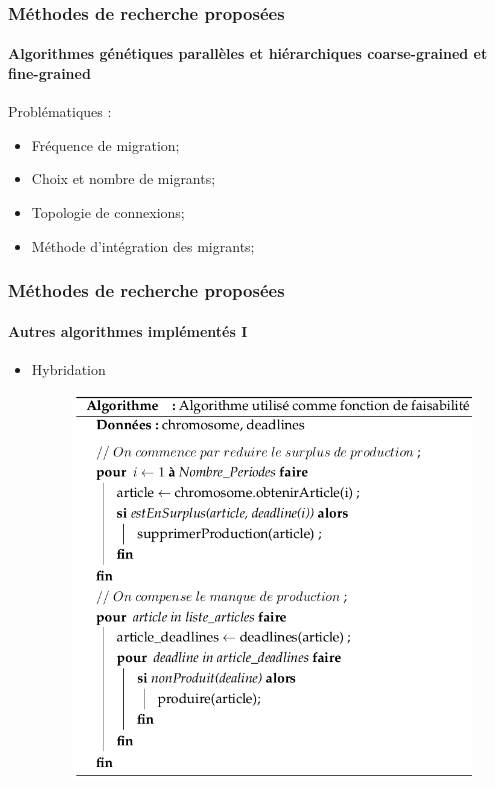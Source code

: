 \documentclass[11pt]{beamer}
\begin{document}
 \begin{frame}
 \frametitle{Méthodes de recherche proposées}
 \framesubtitle{Algorithmes génétiques parallèles et hiérarchiques coarse-grained et
fine-grained}
	
	Problématiques :
	\begin{itemize}
		\item Fréquence de migration;
		\item Choix et nombre de migrants;
		\item Topologie de connexions;
		\item Méthode d’intégration des migrants;
	\end{itemize}
	
 \end{frame}
 
 \begin{frame}
 \frametitle{Méthodes de recherche proposées}
 \framesubtitle{Autres algorithmes implémentés I}
	
	\begin{itemize}
		\item Hybridation
		\begin{figure}[!h]
		\begin{center}
			\includegraphics[scale=.3
			]{img/faisabilite_algo.png}
		\end{center}
 \end{figure}
	\end{itemize}
	
 \end{frame}
 
\end{document}
